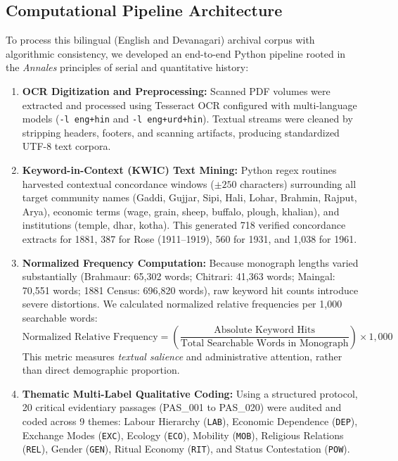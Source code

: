 \documentclass[11pt,a4paper]{article}
\begin{document}
\subsection{Computational Pipeline Architecture}
To process this bilingual (English and Devanagari) archival corpus with algorithmic consistency, we developed an end-to-end Python pipeline rooted in the \textit{Annales} principles of serial and quantitative history:
\begin{enumerate}[leftmargin=*]
    \item \textbf{OCR Digitization and Preprocessing:} Scanned PDF volumes were extracted and processed using Tesseract OCR configured with multi-language models (\texttt{-l eng+hin} and \texttt{-l eng+urd+hin}). Textual streams were cleaned by stripping headers, footers, and scanning artifacts, producing standardized UTF-8 text corpora.
    \item \textbf{Keyword-in-Context (KWIC) Text Mining:} Python regex routines harvested contextual concordance windows ($\pm 250$ characters) surrounding all target community names (Gaddi, Gujjar, Sipi, Hali, Lohar, Brahmin, Rajput, Arya), economic terms (wage, grain, sheep, buffalo, plough, khalian), and institutions (temple, dhar, kotha). This generated 718 verified concordance extracts for 1881, 387 for Rose (1911--1919), 560 for 1931, and 1,038 for 1961.
    \item \textbf{Normalized Frequency Computation:} Because monograph lengths varied substantially (Brahmaur: 65,302 words; Chitrari: 41,363 words; Maingal: 70,551 words; 1881 Census: 696,820 words), raw keyword hit counts introduce severe distortions. We calculated normalized relative frequencies per 1,000 searchable words:
    \[
    \text{Normalized Relative Frequency} = \left( \frac{\text{Absolute Keyword Hits}}{\text{Total Searchable Words in Monograph}} \right) \times 1,000
    \]
    This metric measures \textit{textual salience} and administrative attention, rather than direct demographic proportion.
    \item \textbf{Thematic Multi-Label Qualitative Coding:} Using a structured protocol, 20 critical evidentiary passages (PAS\_001 to PAS\_020) were audited and coded across 9 themes: Labour Hierarchy (\texttt{LAB}), Economic Dependence (\texttt{DEP}), Exchange Modes (\texttt{EXC}), Ecology (\texttt{ECO}), Mobility (\texttt{MOB}), Religious Relations (\texttt{REL}), Gender (\texttt{GEN}), Ritual Economy (\texttt{RIT}), and Status Contestation (\texttt{POW}).
\end{enumerate}
\end{document}
